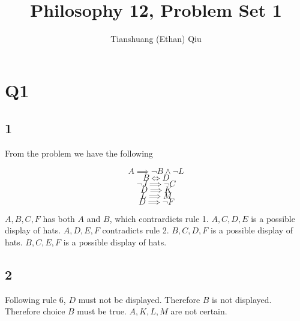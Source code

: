 \documentclass[12pt]{article}
\author{Tianshuang (Ethan) Qiu}
\begin{document}
\title{Philosophy 12, Problem Set 1}
\maketitle

\section{Q1}

\subsection{1}
From the problem we have the following

\begin{equation}
    A \implies \neg B \land \neg L
\end{equation}
\begin{equation}
    B \iff D
\end{equation}
\begin{equation}
    \neg J \implies \neg C
\end{equation}
\begin{equation}
    D \implies K
\end{equation}
\begin{equation}
    L \implies M
\end{equation}
\begin{equation}
    D \implies \neg F
\end{equation}

$A, B, C, F$ has both $A$ and $B$, which contrardicts rule 1.
\newline
$A, C, D, E$ is a possible display of hats.
\newline
$A, D, E, F$ contradicts rule 2.
\newline
$B, C, D, F$ is a possible display of hats.
\newline
$B, C, E, F$ is a possible display of hats.

\subsection{2}
Following rule 6, $D$ must not be displayed. Therefore $B$ is not displayed. Therefore choice $B$ must be true.
$A, K, L, M$ are not certain.
\end{document}
